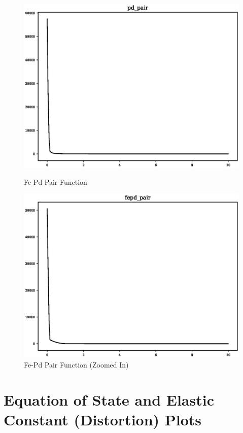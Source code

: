 \begin{figure}[ht] 
  \begin{minipage}[b]{0.4\linewidth}
    \centering
    \includegraphics[width=.9\linewidth]{chapters/results_potential_fitting/pot_fepd_fcc_1/pd_pair.eps} 
    \caption{Fe-Pd Pair Function}   
  \end{minipage}%
  \begin{minipage}[b]{0.4\linewidth}
    \centering
    \includegraphics[width=.9\linewidth]{chapters/results_potential_fitting/pot_fepd_fcc_1/fepd_pair.eps} 
    \caption{Fe-Pd Pair Function (Zoomed In)}  
  \end{minipage}%
\end{figure}




\FloatBarrier
\section{Equation of State and Elastic Constant (Distortion) Plots}
\label{section:fepdv1eosec}

